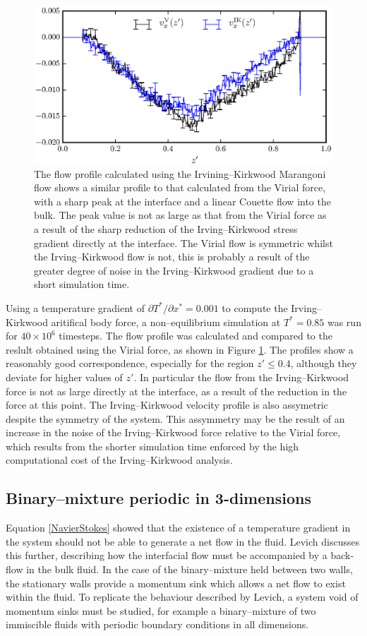 \begin{figure}[h]
\centering
\includegraphics[scale=0.8]{PisIKFlow}
\caption{The flow profile calculated using the Irvining--Kirkwood Marangoni flow shows a similar profile to that calculated from the Virial force, with a sharp peak at the interface and a linear Couette flow into the bulk.
The peak value is not as large as that from the Virial force as a result of the sharp reduction of the Irving--Kirkwood stress gradient directly at the interface.
The Virial flow is symmetric whilst the Irving--Kirkwood flow is not, this is probably a result of the greater degree of noise in the Irving--Kirkwood gradient due to a short simulation time.}
\label{PisIKFlow}
\end{figure}
Using a temperature gradient of $\partial T^{*} / \partial x^{*} = 0.001$ to compute the Irving--Kirkwood aritifical body force, a non--equilibrium simulation at $T^{*} = 0.85$ was run for $40 \times 10^{6}$ timesteps.
The flow profile was calculated and compared to the reslult obtained using the Virial force, as shown in Figure \ref{PisIKFlow}.
The profiles show a reasonably good correspondence, especially for the region $z' \leq 0.4$, although they deviate for higher values of $z'$.
In particular the flow from the Irving--Kirkwood force is not as large directly at the interface, as a result of the reduction in the force at this point.
The Irving--Kirkwood velocity profile is also assymetric despite the symmetry of the system.
This assymmetry may be the result of an increase in the noise of the Irving--Kirkwood force relative to the Virial force, which results from the shorter simulation time enforced by the high computational cost of the Irving--Kirkwood analysis.

\subsection{Binary--mixture periodic in 3-dimensions}
Equation \ref{NavierStokes} showed that the existence of a temperature gradient in the system should not be able to generate a net flow in the fluid. 
Levich discusses this further, describing how the interfacial flow must be accompanied by a back-flow in the bulk fluid.\cite{Levich}
In the case of the binary--mixture held between two walls, the stationary walls provide a momentum sink which allows a net flow to exist within the fluid.
To replicate the behaviour described by Levich, a system void of momentum sinks must be studied, for example a binary--mixture of two immiscible fluids with periodic boundary conditions in all dimensions.

